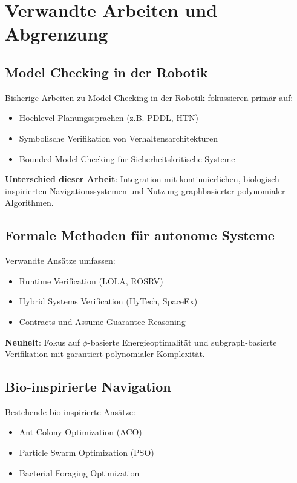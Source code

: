 ﻿\documentclass[a4paper,12pt]{article}
\theoremstyle{definition}
\begin{document}
\section{Verwandte Arbeiten und Abgrenzung}

\subsection{Model Checking in der Robotik}

Bisherige Arbeiten zu Model Checking in der Robotik fokussieren primär auf:
\begin{itemize}
	\item Hochlevel-Planungssprachen (z.B. PDDL, HTN)
	\item Symbolische Verifikation von Verhaltensarchitekturen
	\item Bounded Model Checking für Sicherheitskritische Systeme
\end{itemize}

\textbf{Unterschied dieser Arbeit}: Integration mit kontinuierlichen, biologisch inspirierten Navigationssystemen und Nutzung graphbasierter polynomialer Algorithmen.

\subsection{Formale Methoden für autonome Systeme}

Verwandte Ansätze umfassen:
\begin{itemize}
	\item Runtime Verification (LOLA, ROSRV)
	\item Hybrid Systems Verification (HyTech, SpaceEx)
	\item Contracts und Assume-Guarantee Reasoning
\end{itemize}

\textbf{Neuheit}: Fokus auf $\phi$-basierte Energieoptimalität und subgraph-basierte Verifikation mit garantiert polynomialer Komplexität.

\subsection{Bio-inspirierte Navigation}

Bestehende bio-inspirierte Ansätze:
\begin{itemize}
	\item Ant Colony Optimization (ACO)
	\item Particle Swarm Optimization (PSO)
	\item Bacterial Foraging Optimization
\end{itemize}
\end{document}
